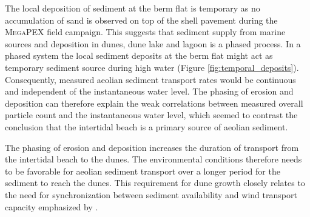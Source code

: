 The local deposition of sediment at the berm flat is temporary as no
accumulation of sand is observed on top of the shell pavement during
the \textsc{MegaPEX} field campaign. This suggests that sediment
supply from marine sources and deposition in dunes, dune lake and
lagoon is a phased process. In a phased system the local sediment
deposits at the berm flat might act as temporary sediment source
during high water (Figure \ref{fig:temporal_deposits}). Consequently,
measured aeolian sediment transport rates would be continuous and
independent of the instantaneous water level. The phasing of erosion
and deposition can therefore explain the weak correlations between
measured overall particle count and the instantaneous water level,
which seemed to contrast the conclusion that the intertidal beach is a
primary source of aeolian sediment.

The phasing of erosion and deposition increases the duration of
transport from the intertidal beach to the dunes. The environmental
conditions therefore needs to be favorable for aeolian sediment
transport over a longer period for the sediment to reach the
dunes. This requirement for dune growth closely relates to the need
for synchronization between sediment availability and wind transport
capacity emphasized by \citet{Houser2009, Anthony2013}.



